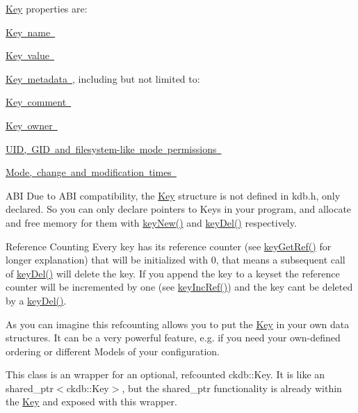 \mbox{\hyperlink{classkdb_1_1Key}{Key}} properties are\+:
\begin{DoxyItemize}
\item \mbox{\hyperlink{group__keyname}{Key name }}
\item \mbox{\hyperlink{group__keyvalue}{Key value }}
\item \mbox{\hyperlink{group__keymeta}{Key metadata }}, including but not limited to\+:
\begin{DoxyItemize}
\item \mbox{\hyperlink{group__meta_gafb89735689929ff717cc9f2d0d0b46a2}{Key comment }}
\item \mbox{\hyperlink{owner_8c_a35922a017bee8b4bcb493bbdfad9d6f5}{Key owner }}
\item \mbox{\hyperlink{group__keymeta}{U\+ID, G\+ID and filesystem-\/like mode permissions }}
\item \mbox{\hyperlink{group__keymeta}{Mode, change and modification times }}
\end{DoxyItemize}
\end{DoxyItemize}

\begin{DoxyParagraph}{A\+BI}
Due to A\+BI compatibility, the {\ttfamily \mbox{\hyperlink{classkdb_1_1Key}{Key}}} structure is not defined in kdb.\+h, only declared. So you can only declare {\ttfamily pointers} to {\ttfamily Keys} in your program, and allocate and free memory for them with \mbox{\hyperlink{group__key_gad23c65b44bf48d773759e1f9a4d43b89}{key\+New()}} and \mbox{\hyperlink{group__key_ga3df95bbc2494e3e6703ece5639be5bb1}{key\+Del()}} respectively.
\end{DoxyParagraph}
\begin{DoxyParagraph}{Reference Counting}
Every key has its reference counter (see \mbox{\hyperlink{group__key_ga4aabc4272506dd63161db2bbb42de8ae}{key\+Get\+Ref()}} for longer explanation) that will be initialized with 0, that means a subsequent call of \mbox{\hyperlink{group__key_ga3df95bbc2494e3e6703ece5639be5bb1}{key\+Del()}} will delete the key. If you append the key to a keyset the reference counter will be incremented by one (see \mbox{\hyperlink{group__key_ga6970a6f254d67af7e39f8e469bb162f1}{key\+Inc\+Ref()}}) and the key can\textquotesingle{}t be deleted by a \mbox{\hyperlink{group__key_ga3df95bbc2494e3e6703ece5639be5bb1}{key\+Del()}}.
\end{DoxyParagraph}
\begin{DoxyParagraph}{}
As you can imagine this refcounting allows you to put the \mbox{\hyperlink{classkdb_1_1Key}{Key}} in your own data structures. It can be a very powerful feature, e.\+g. if you need your own-\/defined ordering or different Models of your configuration.
\end{DoxyParagraph}
This class is an wrapper for an optional, refcounted ckdb\+::\+Key. It is like an shared\+\_\+ptr$<$ckdb\+::\+Key$>$, but the shared\+\_\+ptr functionality is already within the \mbox{\hyperlink{classkdb_1_1Key}{Key}} and exposed with this wrapper.


